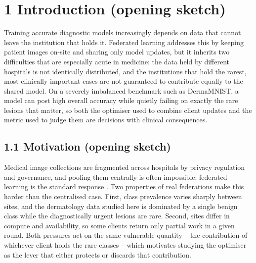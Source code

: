 \section*{1 Introduction (opening sketch)}
Training accurate diagnostic models increasingly depends on data that cannot
leave the institution that holds it. Federated learning addresses this by keeping
patient images on-site and sharing only model updates, but it inherits two
difficulties that are especially acute in medicine: the data held by different
hospitals is not identically distributed, and the institutions that hold the
rarest, most clinically important cases are not guaranteed to contribute equally
to the shared model. On a severely imbalanced benchmark such as DermaMNIST, a
model can post high overall accuracy while quietly failing on exactly the rare
lesions that matter, so both the optimiser used to combine client updates and the
metric used to judge them are decisions with clinical consequences.


\subsection*{1.1 Motivation (opening sketch)}
Medical image collections are fragmented across hospitals by privacy regulation
and governance, and pooling them centrally is often impossible; federated
learning is the standard response \citep{rieke2020future,sheller2020medicalfl}.
Two properties of real federations make this harder than the centralised case.
First, class prevalence varies sharply between sites, and the dermatology data
studied here is dominated by a single benign class while the diagnostically
urgent lesions are rare. Second, sites differ in compute and availability, so
some clients return only partial work in a given round. Both pressures act on the
same vulnerable quantity -- the contribution of whichever client holds the rare
classes -- which motivates studying the optimiser as the lever that either
protects or discards that contribution.


